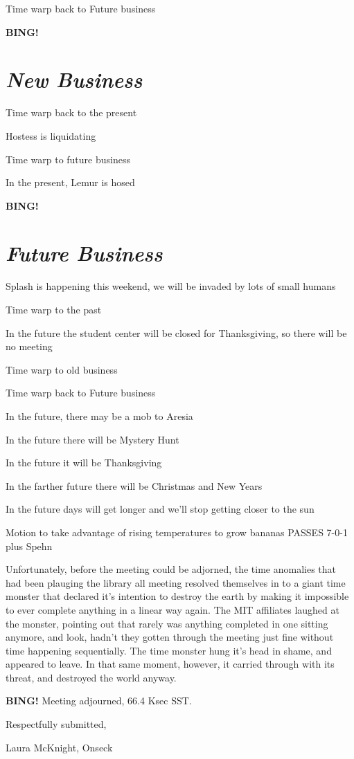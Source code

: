 \documentclass[10pt]{article}
\newcommand{\bing}{{\bf BING!} }
\newcommand{\goto}[1]{\bing \vskip 12pt \section*{{\em{#1}}}}
\newcommand{\ps}{ plus Spehn\xspace}
\newcommand{\onseck}{Laura McKnight, Onseck}
\begin{document}
Time warp back to Future business

\goto{New Business}
 
Time warp back to the present 

Hostess is liquidating

Time warp to future business

In the present, Lemur is hosed

\goto{Future Business}

Splash is happening this weekend, we will be invaded by lots of small humans

Time warp to the past

In the future the student center will be closed for Thanksgiving, so there will be no meeting

Time warp to old business

Time warp back to Future business

In the future, there may be a mob to Aresia

In the future there will be Mystery Hunt

In the future it will be Thanksgiving

In the farther future there will be Christmas and New Years

In the future days will get longer and we'll stop getting closer to the sun

Motion to take advantage of rising temperatures to grow bananas PASSES 7-0-1\ps

Unfortunately, before the meeting could be adjorned, the time anomalies that had been plauging the library all meeting resolved themselves in to a giant time monster that declared it's intention to destroy the earth by making it impossible to ever complete anything in a linear way again. The MIT affiliates laughed at the monster, pointing out that rarely was anything completed in one sitting anymore, and look, hadn't they gotten through the meeting just fine without time happening sequentially. The time monster hung it's head in shame, and appeared to leave.
In that same moment, however, it carried through with its threat, and destroyed the world anyway.

\bing
\noindent
Meeting adjourned, 66.4 Ksec SST.

\vspace{18pt}

\centerline{Respectfully submitted,}
\centerline{\onseck}
\end{document}
